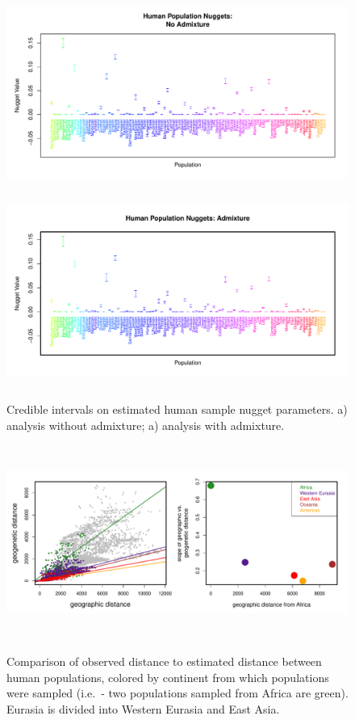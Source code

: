 \documentclass[12pt]{article}
\begin{document}
\begin{figure}
\centering
	\subcaptionbox{\label{globe_noad_nugg}}
		{\includegraphics[width=5in,height=2.5in]{figs/globetrotter/globe_NoAd_nugget.pdf}}
	\subcaptionbox{\label{globe_ad_nugg}}
		{\includegraphics[width=5in,height=2.5in]{figs/globetrotter/globe_Ad_nugget.pdf}}
	\caption{Credible intervals on estimated human sample nugget parameters. a) analysis without admixture; a) analysis with admixture.}
	\label{sfig:globe_nuggs}
\end{figure}

\clearpage

\clearpage

\begin{figure}
	\centering
		{\includegraphics[width=6in,height=2.5in]{figs/globetrotter/globe_NoAd_dist_decay.pdf}}
	\caption{Comparison of observed distance to estimated distance between human populations, colored by continent from which populations were sampled (i.e.\ - two populations sampled from Africa are green).  Eurasia is divided into Western Eurasia and East Asia.}
\label{sfig:globe_noad_distcomp}
\end{figure}
\end{document}
